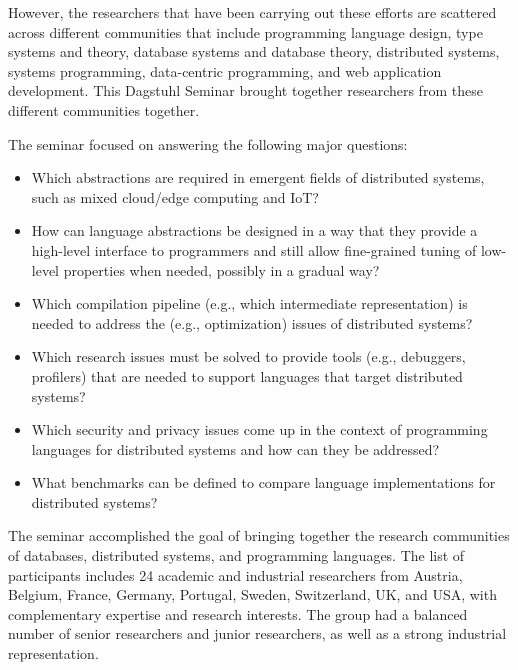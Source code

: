\documentclass[a4paper,UKenglish]{dagrep-v2018}
\begin{document}
However, the researchers that have been carrying out these efforts are scattered across different communities that include programming language design, type systems and theory, database systems and database theory, distributed systems, systems programming, data-centric programming, and web application development. This Dagstuhl Seminar brought together researchers from these different communities together.

The seminar focused on answering the following major questions: %

\begin{itemize}

\item Which abstractions are required in emergent fields of distributed systems, such as mixed cloud/edge computing and IoT?

\item How can language abstractions be designed in a way that they provide a high-level interface to programmers and still allow fine-grained tuning of low-level properties when needed, possibly in a gradual way?

\item Which compilation pipeline (e.g., which intermediate representation) is needed to address the (e.g., optimization) issues of distributed systems?

\item Which research issues must be solved to provide tools (e.g., debuggers, profilers) that are needed to support languages that target distributed systems?

\item Which security and privacy issues come up in the context of programming languages for distributed systems and how can they be addressed?

\item What benchmarks can be defined to compare language implementations for distributed systems?
\end{itemize}

The seminar accomplished the goal of bringing together the research communities of databases, distributed systems, and programming languages. The list of participants includes  24 academic and industrial researchers from Austria, Belgium, France, Germany, Portugal, Sweden, Switzerland, UK, and USA, with complementary expertise and research interests. 
The group had a balanced number of senior researchers and junior researchers, as well as a strong industrial representation.
\end{document}
